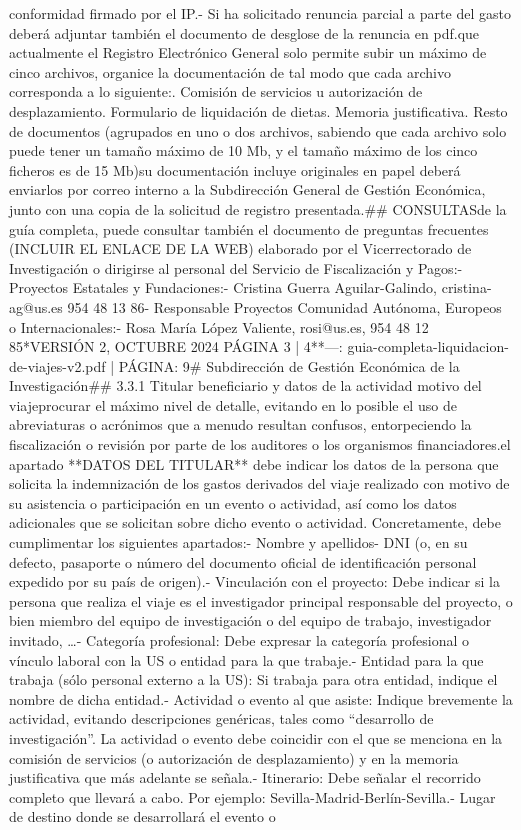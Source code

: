 \documentclass{article}
\begin{document}
\begin{itemize}
{{conformidad firmado por el IP.\n- Si ha solicitado renuncia parcial a parte del gasto deberá adjuntar también el documento de desglose de la renuncia en pdf.\n\nDado que actualmente el Registro Electrónico General solo permite subir un máximo de cinco archivos, organice la documentación de tal modo que cada archivo corresponda a lo siguiente:\n{}. Comisión de servicios u autorización de desplazamiento. Formulario de liquidación de dietas. Memoria justificativa. Resto de documentos (agrupados en uno o dos archivos, sabiendo que cada archivo solo puede tener un tamaño máximo de 10 Mb, y el tamaño máximo de los cinco ficheros es de 15 Mb)\n\nSi su documentación incluye originales en papel deberá enviarlos por correo interno a la Subdirección General de Gestión Económica, junto con una copia de la solicitud de registro presentada.\n\n## CONSULTAS\n{} de la guía completa, puede consultar también el documento de preguntas frecuentes (INCLUIR EL ENLACE DE LA WEB) elaborado por el Vicerrectorado de Investigación o dirigirse al personal del Servicio de Fiscalización y Pagos:\n\n- Proyectos Estatales y Fundaciones:\n- Cristina Guerra Aguilar-Galindo, cristina-ag@us.es 954 48 13 86\n- Responsable Proyectos Comunidad Autónoma, Europeos o Internacionales:\n- Rosa María López Valiente, rosi@us.es, 954 48 12 85\n\n**VERSIÓN 2, OCTUBRE 2024        PÁGINA 3 | 4**\n\n---\n\nFUENTE: guia-completa-liquidacion-de-viajes-v2.pdf | PÁGINA: 9\n# Subdirección de Gestión Económica de la Investigación\n\n## 3.3.1 Titular beneficiario y datos de la actividad motivo del viaje\n\nDebe procurar el máximo nivel de detalle, evitando en lo posible el uso de abreviaturas o acrónimos que a menudo resultan confusos, entorpeciendo la fiscalización o revisión por parte de los auditores o los organismos financiadores.\n\nEn el apartado **DATOS DEL TITULAR** debe indicar los datos de la persona que solicita la indemnización de los gastos derivados del viaje realizado con motivo de su asistencia o participación en un evento o actividad, así como los datos adicionales que se solicitan sobre dicho evento o actividad. Concretamente, debe cumplimentar los siguientes apartados:\n\n- Nombre y apellidos\n- DNI (o, en su defecto, pasaporte o número del documento oficial de identificación personal expedido por su país de origen).\n- Vinculación con el proyecto: Debe indicar si la persona que realiza el viaje es el investigador principal responsable del proyecto, o bien miembro del equipo de investigación o del equipo de trabajo, investigador invitado, …\n- Categoría profesional: Debe expresar la categoría profesional o vínculo laboral con la US o entidad para la que trabaje.\n- Entidad para la que trabaja (sólo personal externo a la US): Si trabaja para otra entidad, indique el nombre de dicha entidad.\n- Actividad o evento al que asiste: Indique brevemente la actividad, evitando descripciones genéricas, tales como “desarrollo de investigación”. La actividad o evento debe coincidir con el que se menciona en la comisión de servicios (o autorización de desplazamiento) y en la memoria justificativa que más adelante se señala.\n- Itinerario: Debe señalar el recorrido completo que llevará a cabo. Por ejemplo: Sevilla-Madrid-Berlín-Sevilla.\n- Lugar de destino donde se desarrollará el evento o }}
\end{itemize}
\end{document}
